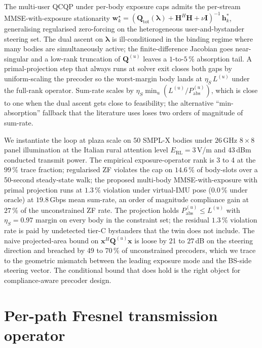 \documentclass[journal,twocolumn,10pt]{IEEEtran}
\theoremstyle{plain}
\theoremstyle{remark}
\newcommand{\xx}{\mathbf{x}}
\newcommand{\hh}{\mathbf{h}}
\newcommand{\ww}{\mathbf{w}}
\newcommand{\Pabs}{P_{\mathrm{abs}}}
\newcommand{\Qmat}{\mathbf{Q}}
\begin{document}
The multi-user QCQP under per-body exposure caps admits the
per-stream MMSE-with-exposure stationarity
$\ww_k^\star = (\Qmat_{\mathrm{tot}}(\bm\lambda) + \mathbf{H}^H
\mathbf{H} + \nu \mathbf{I})^{-1}\,\hh_k^*$, generalising regularised
zero-forcing on the heterogeneous user-and-bystander steering set.
The dual ascent on $\bm\lambda$ is ill-conditioned in the binding
regime where many bodies are simultaneously active; the
finite-difference Jacobian goes near-singular and a low-rank
truncation of $\Qmat^{(u)}$ leaves a $1$-to-$5\,\%$ absorption tail.
A primal-projection step that always runs at solver exit closes
both gaps by uniform-scaling the precoder so the worst-margin body
lands at $\eta_S\,L^{(u)}$ under the full-rank operator. Sum-rate
scales by $\eta_S \min_u(L^{(u)}/\Pabs^{(u)})$, which is close to
one when the dual ascent gets close to feasibility; the alternative
``min-absorption'' fallback that the literature uses loses two
orders of magnitude of sum-rate.

We instantiate the loop at plaza scale on 50 SMPL-X bodies under
$26\,$GHz $8 \times 8$ panel illumination at the Italian rural
attention level $E_{\mathrm{RL}} = 3\,$V/m and $43\,$dBm conducted
transmit power. The empirical exposure-operator rank is 3 to 4 at
the $99\,\%$ trace fraction; regularised ZF violates the cap on
$14.6\,\%$ of body-slots over a 50-second steady-state walk; the
proposed multi-body MMSE-with-exposure with primal projection runs
at $1.3\,\%$ violation under virtual-IMU pose ($0.0\,\%$ under
oracle) at $19.8\,$Gbps mean sum-rate, an order of magnitude
compliance gain at $27\,\%$ of the unconstrained ZF rate. The
projection holds $\Pabs^{(u)} \leq L^{(u)}$ with $\eta_S = 0.97$
margin on every body in the constraint set; the residual $1.3\,\%$
violation rate is paid by undetected tier-C bystanders that the
twin does not include. The naive projected-area bound on
$\xx^H \Qmat^{(u)} \xx$ is loose by 21 to $27\,$dB on the steering
direction and breached by 49 to $70\,\%$ of unconstrained precoders,
which we trace to the geometric mismatch between the leading
exposure mode and the BS-side steering vector. The conditional
bound that does hold is the right object for compliance-aware
precoder design.


\appendices

\section{Per-path Fresnel transmission operator}\label{app:fresnel}
\end{document}
